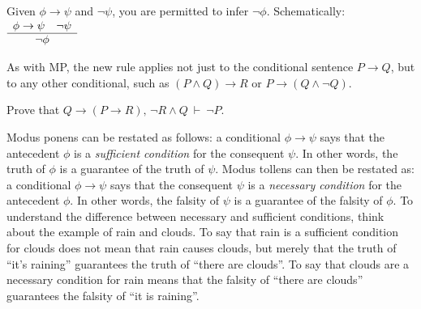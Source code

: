 \bigskip 
\begin{tcolorbox}[enhanced,width=10cm,title=modus tollens (MT),attach boxed title to top
  left={yshift=-2mm,xshift=4mm},boxed title style={sharp corners}]
   Given $\phi\to \psi$ and $\neg \psi$, you are permitted to infer $\neg
  \phi$.  \newline Schematically: $\begin{array}{c c}
       \phi\to \psi \quad \neg\psi \\ \hline
       \neg\phi \end{array} $
   \end{tcolorbox}
\bigskip 


As with MP, the new rule applies not just to the conditional sentence
$P\to Q$, but to any other conditional, such as $(P\wedge Q)\to R$ or
$P\to (Q\wedge \neg Q)$.


\begin{exercise} Prove that
  $Q\to (P\to R),\,\neg R\wedge Q\:\vdash\: \neg P$.
\end{exercise}

Modus ponens can be restated as follows: a conditional $\phi\to \psi$
says that the antecedent $\phi$ is a \emph{\gls{sufficient condition}}
for the consequent $\psi$.  In other words, the truth of $\phi$ is a
guarantee of the truth of $\psi$.  Modus tollens can then be restated
as: a conditional $\phi\to \psi$ says that the consequent $\psi$ is a
\emph{\gls{necessary condition}} for the antecedent $\phi$.  In other
words, the falsity of $\psi$ is a guarantee of the falsity of $\phi$.
To understand the difference between necessary and sufficient
conditions, think about the example of rain and clouds.  To say that
rain is a sufficient condition for clouds does not mean that rain
causes clouds, but merely that the truth of ``it's raining''
guarantees the truth of ``there are clouds''.  To say that clouds are
a necessary condition for rain means that the falsity of ``there are
clouds'' guarantees the falsity of ``it is raining''.

